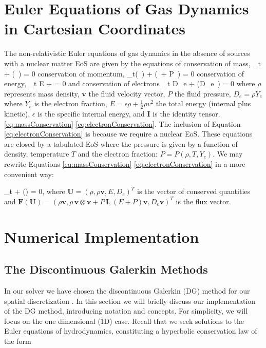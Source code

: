 \documentclass[onecolumn]{aastex62}
\begin{document}
\section{Euler Equations of Gas Dynamics in Cartesian Coordinates}
\label{sec:eulereq}
The non-relativistic Euler equations of gas dynamics
\citep[see, e.g.,][for details in the case of an ideal EoS]{leveque:2002}
in the absence of sources with a nuclear matter EoS are given by
the equations of conservation of mass,
\beq
  \partial_{t} \rho + \divergence{} (\rho\,  ) = 0
  \label{eq:massConservation}
\eeq
conservation of momentum,
\beq
  \partial_{t}(\rho\,  ) + \divergence{}(\rho\,   \otimes {} + P\, ) = 0
  \label{eq:momentumConservation}
\eeq
conservation of energy,
\beq
  \partial_{t} E + \divergence{} = 0
  \label{eq:energyConservation}
\eeq
and conservation of electrons
\beq
  \partial_{t} D_{e} + \divergence{}(D_{e}\, ) = 0
  \label{eq:electronConservation}
\eeq
where $\rho$ represents mass density, $\mathbf{v}$ the fluid velocity vector,
$P$ the fluid pressure, $D_{e}=\rho Y_{e}$ where $Y_{e}$ is the electron fraction,
$E=\epsilon \rho +\frac{1}{2}\rho v^2$ the total energy (internal plus kinetic),
$\epsilon$ is the specific internal energy, and $\mathbf{I}$ is the identity tensor.
\eqref{eq:massConservation}-\eqref{eq:electronConservation}. The inclusion of
Equation \eqref{eq:electronConservation} is because we require a nuclear EoS.
These equations are closed by a tabulated EoS where the pressure is given by a function of
density, temperature $T$ and the electron fraction: $P = P(\rho, T, Y_{e})$.
We may rewrite Equations \eqref{eq:massConservation}-\eqref{eq:electronConservation}
in a more convenient way:

\beq
  \partial_{t} + \divergence{}() = 0,
  \label{eq:conservation}
\eeq
where $\mathbf{U} =(\rho,\rho \mathbf{v},E, D_{e})^{T}$ is the vector of conserved quantities
and $\mathbf{F}(\mathbf{U})=(\rho \mathbf{v},
\rho\, \mathbf{v} \otimes \mathbf{v} + P\, \mathbf{I},(E+P)\mathbf{v}, D_{e}\mathbf{v})^{T}$
is the flux vector.

\section{Numerical Implementation}
\label{sec:DG}

\subsection{The Discontinuous Galerkin Methods}
In our solver we have chosen the discontinuous Galerkin (DG) method
for our spatial discretization \citep[see e.g.,][]{schaal:2015, zhang:2010a, cockburn:1998, cockburn:1989}.
In this section we will briefly discuss our
implementation of the DG method, introducing notation and concepts.
For simplicity, we will focus on the one dimensional (1D) case. Recall that
we seek solutions to the Euler equations of hydrodynamics, constituting a
hyperbolic conservation law of the form
\end{document}
